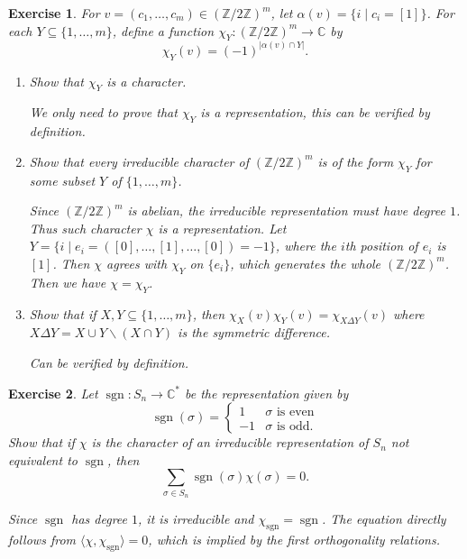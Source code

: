 \documentclass[11pt]{report}
\theoremstyle{mythm}
\let\oldendproof\endproof
\renewenvironment{proof}[1][\proofname]{%
  \oldproof[\normalfont \bfseries #1]%
}{\oldendproof}
\newtheorem{exercise}{Exercise}[chapter]
\renewcommand*{\proofname}{Proof}
\theoremstyle{myans}
\newcommand{\bbZ}{\mathbb Z}
\newcommand{\bbC}{\mathbb C}
\DeclareMathOperator{\sgn}{sgn}
\newcommand{\ang}[1]{\langle #1 \rangle}
\begin{document}
\begin{exercise}
  For $v = (c_1, \dots , c_m) \in (\bbZ/2\bbZ)^m$, let $\alpha(v) = \{i \mid c_i = [1]\}$. For
  each $Y \subseteq \{1, \dots, m\}$, define a function $\chi_Y\colon (\bbZ/2\bbZ)^m \to \bbC$ by
  \[ \chi_Y (v) = (-1)^{|\alpha(v) \cap Y|}. \]
  \begin{enumerate}
    \item Show that $\chi_Y$ is a character.
    \begin{proof}
      We only need to prove that $\chi_Y$ is a representation, this can be verified by definition.
    \end{proof}
    \item Show that every irreducible character of $(\bbZ/2\bbZ)^m$ is of the form $\chi_Y$ for some
    subset $Y$ of $\{1, \dots , m\}$.
    \begin{proof}
      Since $(\bbZ/2\bbZ)^m$ is abelian, the irreducible representation must have degree $1$.
      Thus such character $\chi$ is a representation. Let $Y = \{ i \mid e_i = ([0], \dots, [1], \dots, [0]) = -1 \}$,
      where the $i$th position of $e_i$ is $[1]$.
      Then $\chi$ agrees with $\chi_Y$ on $\{ e_i \}$, which generates the whole $(\bbZ/2\bbZ)^m$.
      Then we have $\chi = \chi_Y$.
    \end{proof}
    \item Show that if $X, Y \subseteq \{1, \dots , m\}$, then $\chi_X(v)\chi_Y (v) = \chi_{X\Delta Y}(v)$ where
    $X \Delta Y = X\cup Y \smallsetminus (X\cap Y)$ is the symmetric difference.
    \begin{proof}
      Can be verified by definition.
    \end{proof}
  \end{enumerate}
\end{exercise}

\begin{exercise}
  Let $\sgn\colon S_n \to \bbC^*$ be the representation given by
  \[ \sgn(\sigma) = \begin{cases}
    1 & \sigma \text{ is even}\\
    -1 & \sigma \text{ is odd.}
  \end{cases} \]
  Show that if $\chi$ is the character of an irreducible representation of $S_n$ not equivalent
  to $\sgn$, then
  \[ \sum_{\sigma \in S_n} \sgn(\sigma) \chi(\sigma) = 0. \]
  \begin{proof}
    Since $\sgn$ has degree $1$, it is irreducible and $\chi_{\sgn} = \sgn$.
    The equation directly follows from $\ang{\chi, \chi_{\sgn}} = 0$, which is implied by
    the first orthogonality relations.
  \end{proof}
\end{exercise}
\end{document}
